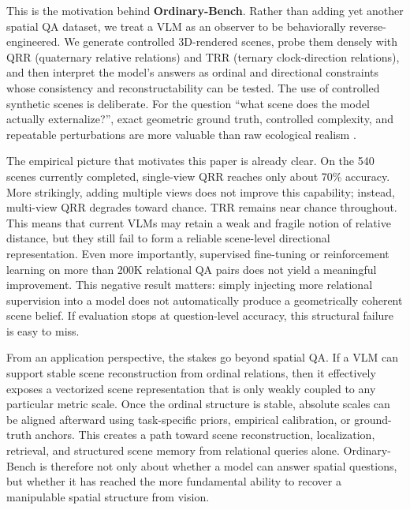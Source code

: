 This is the motivation behind \textbf{Ordinary-Bench}. Rather than adding yet another spatial QA dataset, we treat a VLM as an observer to be behaviorally reverse-engineered. We generate controlled 3D-rendered scenes, probe them densely with QRR (quaternary relative relations) and TRR (ternary clock-direction relations), and then interpret the model's answers as ordinal and directional constraints whose consistency and reconstructability can be tested. The use of controlled synthetic scenes is deliberate. For the question ``what scene does the model actually externalize?'', exact geometric ground truth, controlled complexity, and repeatable perturbations are more valuable than raw ecological realism \cite{johnson2017clevr,yi2020clevrer}.

The empirical picture that motivates this paper is already clear. On the 540 scenes currently completed, single-view QRR reaches only about 70\% accuracy. More strikingly, adding multiple views does not improve this capability; instead, multi-view QRR degrades toward chance. TRR remains near chance throughout. This means that current VLMs may retain a weak and fragile notion of relative distance, but they still fail to form a reliable scene-level directional representation. Even more importantly, supervised fine-tuning or reinforcement learning on more than 200K relational QA pairs does not yield a meaningful improvement. This negative result matters: simply injecting more relational supervision into a model does not automatically produce a geometrically coherent scene belief. If evaluation stops at question-level accuracy, this structural failure is easy to miss.

From an application perspective, the stakes go beyond spatial QA. If a VLM can support stable scene reconstruction from ordinal relations, then it effectively exposes a vectorized scene representation that is only weakly coupled to any particular metric scale. Once the ordinal structure is stable, absolute scales can be aligned afterward using task-specific priors, empirical calibration, or ground-truth anchors. This creates a path toward scene reconstruction, localization, retrieval, and structured scene memory from relational queries alone. Ordinary-Bench is therefore not only about whether a model can answer spatial questions, but whether it has reached the more fundamental ability to recover a manipulable spatial structure from vision.

